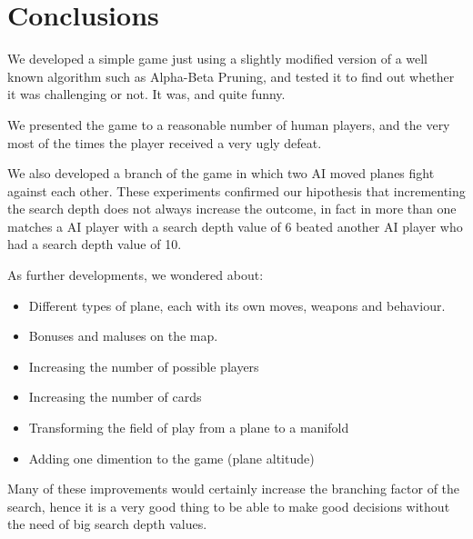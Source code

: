 \chapter{Conclusions}
We developed a simple game just using a slightly modified version of a well known algorithm such as Alpha-Beta Pruning, and tested it to find out whether it was challenging or not.
It was, and quite funny.

We presented the game to a reasonable number of human players, and the very most of the times the player received a very ugly defeat.

We also developed a branch of the game in which two AI moved planes fight against each other.
These experiments confirmed our hipothesis that incrementing the search depth does not always increase the outcome, in fact in more than one matches a AI player with a search depth value of 6 beated another AI player who had a search depth value of 10.

As further developments, we wondered about:
\begin{itemize}
\item Different types of plane, each with its own moves, weapons and behaviour.
\item Bonuses and maluses on the map.
\item Increasing the number of possible players
\item Increasing the number of cards
\item Transforming the field of play from a plane to a manifold
\item Adding one dimention to the game (plane altitude)
\end{itemize}

Many of these improvements would certainly increase the branching factor of the search, hence it is a very good thing to be able to make good decisions without the need of big search depth values.